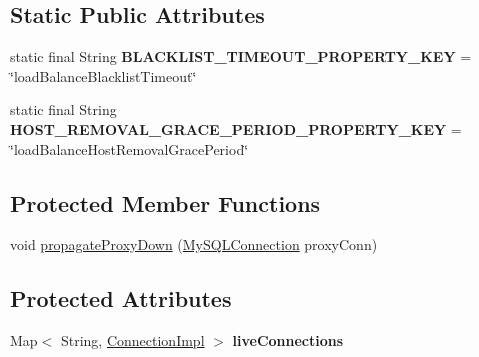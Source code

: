 \subsection*{Static Public Attributes}
\begin{DoxyCompactItemize}
\item 
\mbox{\label{classcom_1_1mysql_1_1jdbc_1_1_load_balanced_connection_proxy_a13abcde9aefe96fb7130181a972cf4ad}} 
static final String {\bfseries B\+L\+A\+C\+K\+L\+I\+S\+T\+\_\+\+T\+I\+M\+E\+O\+U\+T\+\_\+\+P\+R\+O\+P\+E\+R\+T\+Y\+\_\+\+K\+EY} = \char`\"{}load\+Balance\+Blacklist\+Timeout\char`\"{}
\item 
\mbox{\label{classcom_1_1mysql_1_1jdbc_1_1_load_balanced_connection_proxy_a13a90c2b9dee40a4ddb706a89e9c7224}} 
static final String {\bfseries H\+O\+S\+T\+\_\+\+R\+E\+M\+O\+V\+A\+L\+\_\+\+G\+R\+A\+C\+E\+\_\+\+P\+E\+R\+I\+O\+D\+\_\+\+P\+R\+O\+P\+E\+R\+T\+Y\+\_\+\+K\+EY} = \char`\"{}load\+Balance\+Host\+Removal\+Grace\+Period\char`\"{}
\end{DoxyCompactItemize}
\subsection*{Protected Member Functions}
\begin{DoxyCompactItemize}
\item 
void \mbox{\hyperlink{classcom_1_1mysql_1_1jdbc_1_1_load_balanced_connection_proxy_a2ffcb6b0b83a7bb3fa53727073e59970}{propagate\+Proxy\+Down}} (\mbox{\hyperlink{interfacecom_1_1mysql_1_1jdbc_1_1_my_s_q_l_connection}{My\+S\+Q\+L\+Connection}} proxy\+Conn)
\end{DoxyCompactItemize}
\subsection*{Protected Attributes}
\begin{DoxyCompactItemize}
\item 
\mbox{\label{classcom_1_1mysql_1_1jdbc_1_1_load_balanced_connection_proxy_a2e9191a8364bcea777422f2b20fd50db}} 
Map$<$ String, \mbox{\hyperlink{classcom_1_1mysql_1_1jdbc_1_1_connection_impl}{Connection\+Impl}} $>$ {\bfseries live\+Connections}
\end{DoxyCompactItemize}


